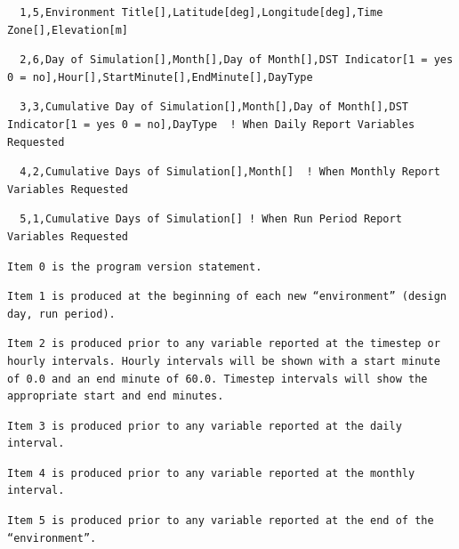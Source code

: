 \begin{lstlisting}
  1,5,Environment Title[],Latitude[deg],Longitude[deg],Time Zone[],Elevation[m]
\end{lstlisting}

\begin{lstlisting}
  2,6,Day of Simulation[],Month[],Day of Month[],DST Indicator[1 = yes 0 = no],Hour[],StartMinute[],EndMinute[],DayType
\end{lstlisting}

\begin{lstlisting}
  3,3,Cumulative Day of Simulation[],Month[],Day of Month[],DST Indicator[1 = yes 0 = no],DayType  ! When Daily Report Variables Requested
\end{lstlisting}

\begin{lstlisting}
  4,2,Cumulative Days of Simulation[],Month[]  ! When Monthly Report Variables Requested
\end{lstlisting}

\begin{lstlisting}
  5,1,Cumulative Days of Simulation[] ! When Run Period Report Variables Requested
\end{lstlisting}

\begin{lstlisting}
Item 0 is the program version statement.
\end{lstlisting}

\begin{lstlisting}
Item 1 is produced at the beginning of each new “environment” (design day, run period).
\end{lstlisting}

\begin{lstlisting}
Item 2 is produced prior to any variable reported at the timestep or hourly intervals. Hourly intervals will be shown with a start minute of 0.0 and an end minute of 60.0. Timestep intervals will show the appropriate start and end minutes.
\end{lstlisting}

\begin{lstlisting}
Item 3 is produced prior to any variable reported at the daily interval.
\end{lstlisting}

\begin{lstlisting}
Item 4 is produced prior to any variable reported at the monthly interval.
\end{lstlisting}

\begin{lstlisting}
Item 5 is produced prior to any variable reported at the end of the “environment”.
\end{lstlisting}

